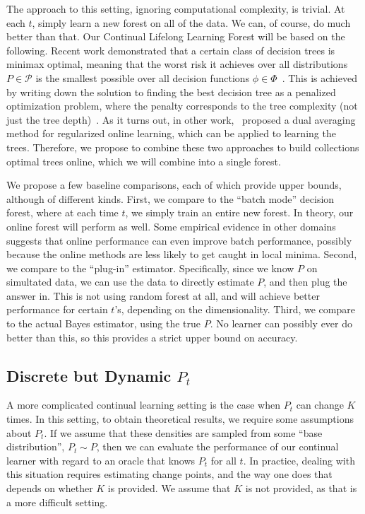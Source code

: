 \documentclass{article}
\begin{document}
The approach to this setting, ignoring computational complexity, is trivial.  At each $t$, simply learn a new forest on all of the data. We can, of course, do much better than that.  Our Continual Lifelong Learning Forest will be based on the following.  Recent work demonstrated that a certain class of decision trees is minimax optimal, meaning that the worst risk it achieves over all distributions $P \in \mathcal{P}$ is the smallest possible over all decision functions $\phi \in \Phi$~\cite{Scott2006}.  This is achieved by writing down the solution to finding the best decision tree as a penalized optimization problem, where the penalty corresponds to the tree complexity (not just the tree depth)~\cite{Scott2005}. As it turns out, in other work,~\citet{Xiao2010} proposed a dual averaging method for regularized online learning, which can be applied to learning the trees. Therefore, we propose to combine these two approaches to build collections optimal trees online, which we will combine into a single forest. 

We propose a few baseline comparisons, each of which provide upper bounds, although of different kinds.  First, we compare to the ``batch mode'' decision forest, where at each time $t$, we simply train an entire new forest.  In theory, our online forest will perform as well.  Some empirical evidence in other domains suggests that online performance can even improve batch performance, possibly because the online methods are less likely to get caught in local minima.  Second, we compare to the ``plug-in'' estimator.  Specifically, since we know $P$ on simultated data, we can use the data to directly estimate $P$, and then plug the answer in.  This is not using random forest at all, and will achieve better performance for certain $t$'s, depending on the dimensionality.  Third, we compare to the actual Bayes estimator, using the true $P$.  No learner can possibly ever do better than this, so this provides a strict upper bound on accuracy. 

\subsection{Discrete but Dynamic $P_t$}
\label{sec:jumps}

A more complicated continual learning setting is the case when $P_t$ can change $K$ times.  In this setting, to obtain theoretical results, we require some assumptions about $P_t$.  If we assume that these densities are sampled from some ``base distribution'', $P_t \sim P$, then we can evaluate the performance of our continual learner with regard to an oracle that knows $P_t$ for all $t$. In practice, dealing with this situation requires estimating change points, and the way one does that depends on whether $K$ is provided.  We assume that $K$ is not provided, as that is a more difficult setting.  
\end{document}
